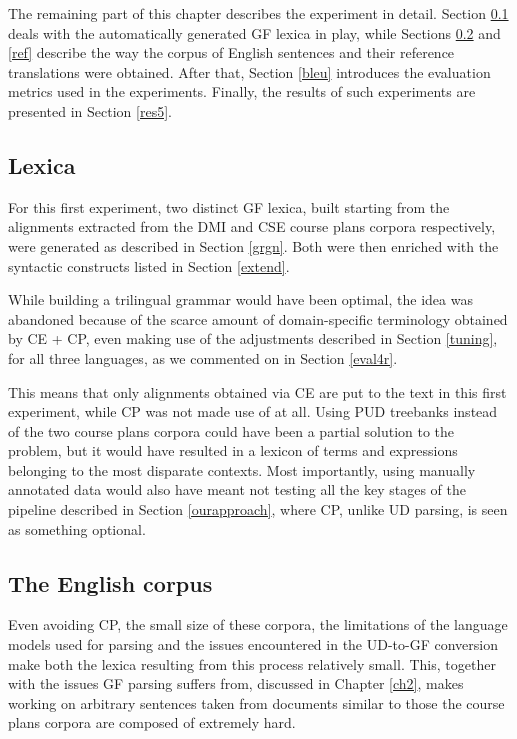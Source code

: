 The remaining part of this chapter describes the experiment in detail. Section \ref{gr} deals with the automatically generated GF lexica in play, while Sections \ref{eng} and \ref{ref} describe the way the corpus of English sentences and their reference translations were obtained. After that, Section \ref{bleu} introduces the evaluation metrics used in the experiments. Finally, the results of such experiments are presented in Section \ref{res5}.

\subsection{Lexica} \label{gr}
For this first experiment, two distinct GF lexica, built starting from the alignments extracted from the DMI and CSE course plans corpora respectively, were generated as described in Section \ref{grgn}. Both were then enriched with the syntactic constructs listed in Section \ref{extend}. \smallskip

While building a trilingual grammar would have been optimal, the idea was abandoned because of the scarce amount of domain-specific terminology obtained by CE + CP, even making use of the adjustments described in Section \ref{tuning}, for all three languages, as we commented on in Section \ref{eval4r}. \smallskip

This means that only alignments obtained via CE are put to the text in this first experiment, while CP was not made use of at all. 
Using PUD treebanks instead of the two course plans corpora could have been a partial solution to the problem, but it would have resulted in a lexicon of terms and expressions belonging to the most disparate contexts.
Most importantly, using manually annotated data would also have meant not testing all the key stages of the pipeline described in Section \ref{ourapproach}, where CP, unlike UD parsing, is seen as something optional.
\smallskip

\subsection{The English corpus} \label{eng}
Even avoiding CP, the small size of these corpora, the limitations of the language models used for parsing and the issues encountered in the UD-to-GF conversion make both the lexica resulting from this process relatively small.
This, together with the issues GF parsing suffers from, discussed in Chapter \ref{ch2}, makes working on arbitrary sentences taken from documents similar to those the course plans corpora are composed of extremely hard. \smallskip

